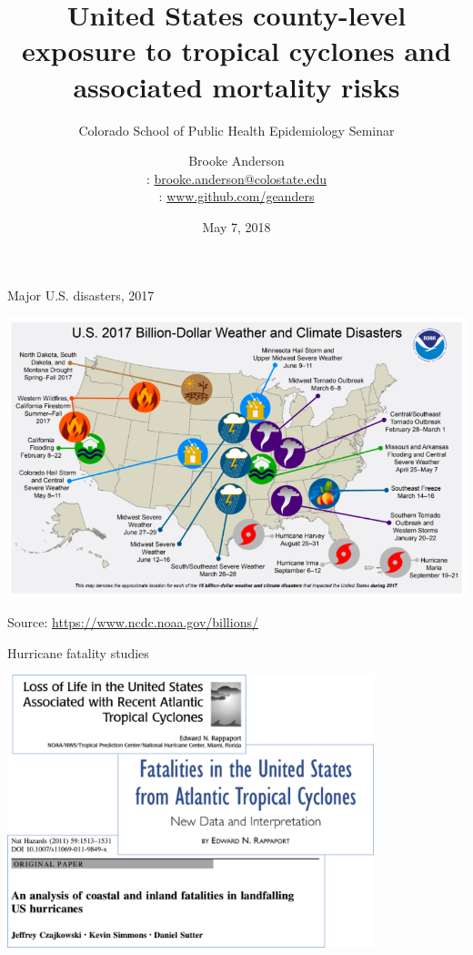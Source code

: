 \documentclass[ignorenonframetext,]{beamer}
\title[Tropical cyclones and mortality]{United States county-level exposure to tropical cyclones and associated mortality risks}
\subtitle{Colorado School of Public Health Epidemiology Seminar}
\date{May 7, 2018}
\author[Brooke Anderson]{
  Brooke Anderson \\\medskip
  {\small \faEnvelope: \url{brooke.anderson@colostate.edu}} \\
  {\small \faGithub:  \url{www.github.com/geanders}}}
\institute[Colorado State University]{
  Department of Environmental \& Radiological Health Sciences \\
  Colorado State University}
\date{}
\begin{document}
\begin{frame}
  \titlepage
\end{frame}

\begin{frame}{Major U.S. disasters, 2017}

\begin{center}\includegraphics[width=\textwidth]{billion_dollar_2017} \end{center}

\vspace{-0.5cm}

\footnotesize

Source: \url{https://www.ncdc.noaa.gov/billions/}

\end{frame}

\begin{frame}{Hurricane fatality studies}

\begin{center}\includegraphics[width=0.8\textwidth]{fatality_studies} \end{center}

\end{frame}
\end{document}
